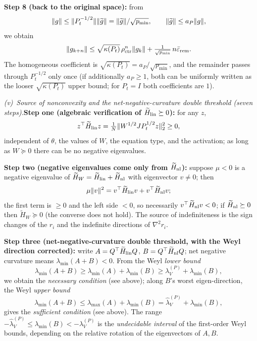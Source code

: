 \documentclass[11pt]{article}
\DeclarePairedDelimiter{\norm}{\lVert}{\rVert}
\newcommand{\W}{W}
\newcommand{\wt}[1]{\widetilde{#1}}
\numberwithin{equation}{section}
\begin{document}
\noindent\textbf{Step 8 (back to the original space):} from
\begin{equation}
\norm g\le\norm{P_t^{-1/2}}\norm{\wt g}=\norm{\wt g}/\sqrt{p_{\min}},\qquad
\norm{\wt g}\le a_P\norm g,
\end{equation}
we obtain
\begin{equation}
\norm{g_{k+n}}\le\sqrt{\kappa(P_t)}\,\rho_{\rm ctr}^n\norm{g_k}+\tfrac1{\sqrt{p_{\min}}}\,n\bar\varepsilon_{\rm rem}.
\label{eq:multistep}
\end{equation}
The homogeneous coefficient is $\sqrt{\kappa(P_t)}=a_P/\sqrt{p_{\min}}$, and the remainder passes through $P_t^{-1/2}$ only once (if additionally $a_P\ge1$, both can be uniformly written as the looser $\sqrt{\kappa(P_t)}$ upper bound; for $P_t=I$ both coefficients are $1$).

\medskip
\emph{(v)~Source of nonconvexity and the net-negative-curvature double threshold (seven steps).}\textbf{Step one (algebraic verification of $\wt H_{\rm lin}\succeq0$):} for any $z$,
\begin{equation}
z^\top\wt H_{\rm lin}z=\tfrac1N\norm{\W^{1/2}JP_t^{1/2}z}_2^2\ge0,
\end{equation}
independent of $\theta$, the values of $\W$, the equation type, and the activation; as long as $\W\succeq0$ there can be no negative eigenvalues.

\noindent\textbf{Step two (negative eigenvalues come only from $\wt H_{\rm nl}$):} suppose $\mu<0$ is a negative eigenvalue of $\wt H_{\W}=\wt H_{\rm lin}+\wt H_{\rm nl}$ with eigenvector $v\ne0$; then
\begin{equation}
\mu\norm v^2=v^\top\wt H_{\rm lin}v+v^\top\wt H_{\rm nl}v;
\end{equation}
the first term is $\ge0$ and the left side $<0$, so necessarily $v^\top\wt H_{\rm nl}v<0$; if $\wt H_{\rm nl}\succeq0$ then $\wt H_{\W}\succeq0$ (the converse does not hold). The source of indefiniteness is the sign changes of the $r_i$ and the indefinite directions of $\nabla^2r_i$.

\noindent\textbf{Step three (net-negative-curvature double threshold, with the Weyl direction corrected):} write $A=Q^\top\wt H_{\rm lin}Q$, $B=Q^\top\wt H_{\rm nl}Q$; net negative curvature means $\lambda_{\min}(A+B)<0$. From the Weyl \emph{lower bound}
\begin{equation}
\lambda_{\min}(A+B)\ge\lambda_{\min}(A)+\lambda_{\min}(B)
\ge\lambda_V^{(P)}+\lambda_{\min}(B),
\end{equation}
we obtain the \emph{necessary condition} (see above); along $B$'s worst eigen-direction, the Weyl \emph{upper bound}
\begin{equation}
\lambda_{\min}(A+B)\le\lambda_{\max}(A)+\lambda_{\min}(B)
=\widehat\lambda_V^{(P)}+\lambda_{\min}(B),
\end{equation}
gives the \emph{sufficient condition} (see above). The range $-\widehat\lambda_V^{(P)}\le\lambda_{\min}(B)<-\lambda_V^{(P)}$ is the \emph{undecidable interval} of the first-order Weyl bounds, depending on the relative rotation of the eigenvectors of $A,B$.
\end{document}
